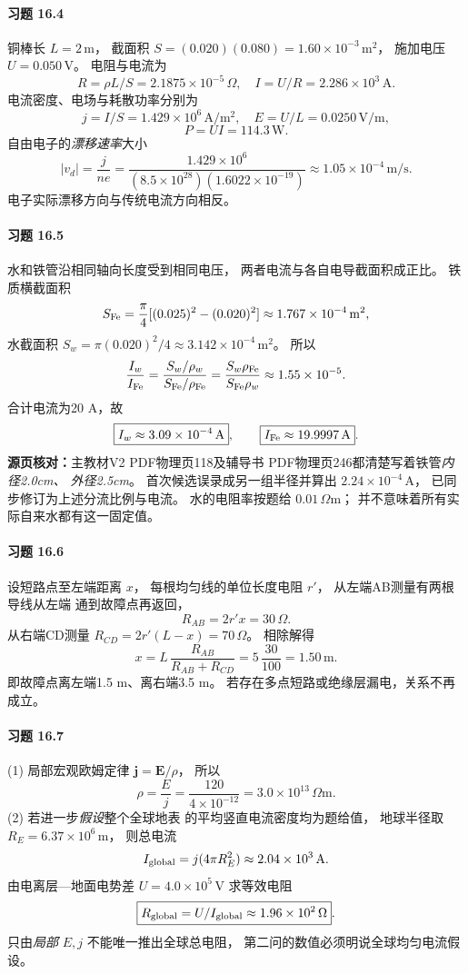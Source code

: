 \paragraph{习题 16.4}
铜棒长 \(L=2\,\mathrm m\)，
截面积
\(S=(0.020)(0.080)=1.60\times10^{-3}\,\mathrm{m^2}\)，
施加电压 \(U=0.050\,\mathrm V\)。
电阻与电流为
\[
 \boxed{R=\rho L/S=2.1875\times10^{-5}\,\Omega},
\quad
 \boxed{I=U/R=2.286\times10^3\,\mathrm A}.
\]
电流密度、电场与耗散功率分别为
\[
 \boxed{j=I/S=1.429\times10^6\,\mathrm{A/m^2}},
\quad
 \boxed{E=U/L=0.0250\,\mathrm{V/m}},
\]
\[
 \boxed{P=UI=114.3\,\mathrm W}.
\]
自由电子的\emph{漂移速率}大小
\[
 \boxed{|v_d|=\frac{j}{ne}
 =\frac{1.429\times10^6}
 {(8.5\times10^{28})(1.6022\times10^{-19})}
 \approx1.05\times10^{-4}\,\mathrm{m/s}}.
\]
电子实际漂移方向与传统电流方向相反。

\paragraph{习题 16.5}
水和铁管沿相同轴向长度受到相同电压，
两者电流与各自电导截面积成正比。
铁质横截面积
\[
 S_{\rm Fe}=\frac\pi4
 [(0.025)^2-(0.020)^2]
 \approx1.767\times10^{-4}\,\mathrm{m^2},
\]
水截面积
\(S_w=\pi(0.020)^2/4
 \approx3.142\times10^{-4}\,\mathrm{m^2}\)。
所以
\[
 \frac{I_w}{I_{\rm Fe}}=
 \frac{S_w/\rho_w}{S_{\rm Fe}/\rho_{\rm Fe}}
 =\frac{S_w\rho_{\rm Fe}}{S_{\rm Fe}\rho_w}
 \approx1.55\times10^{-5}.
\]
合计电流为20 A，故
\[
 \boxed{I_w\approx3.09\times10^{-4}\,\mathrm A},
\qquad
 \boxed{I_{\rm Fe}\approx19.9997\,\mathrm A}.
\]
\textbf{源页核对：}主教材V2 PDF物理页118及辅导书
PDF物理页246都清楚写着铁管\emph{内径2.0cm、
外径2.5cm}。
首次候选误录成另一组半径并算出
\(2.24\times10^{-4}\,\mathrm A\)，
已同步修订为上述分流比例与电流。
水的电阻率按题给 \(0.01\,\Omega\mathrm m\)；
并不意味着所有实际自来水都有这一固定值。

\paragraph{习题 16.6}
设短路点至左端距离 \(x\)，
每根均匀线的单位长度电阻 \(r'\)，
从左端AB测量有两根导线从左端
通到故障点再返回，
\[
 R_{AB}=2r'x=30\,\Omega.
\]
从右端CD测量
\(R_{CD}=2r'(L-x)=70\,\Omega\)。
相除解得
\[
 \boxed{x=L\,\frac{R_{AB}}{R_{AB}+R_{CD}}
 =5\,\frac{30}{100}=1.50\,\mathrm m}.
\]
即故障点离左端1.5 m、离右端3.5 m。
若存在多点短路或绝缘层漏电，关系不再成立。

\paragraph{习题 16.7}
(1) 局部宏观欧姆定律
\(\boldsymbol j=\boldsymbol E/\rho\)，
所以
\[
 \boxed{\rho=\frac Ej
 =\frac{120}{4\times10^{-12}}
 =3.0\times10^{13}\,\Omega\mathrm m}.
\]
(2) 若进一步\emph{假设}整个全球地表
的平均竖直电流密度均为题给值，
地球半径取 \(R_E=6.37\times10^6\,\mathrm m\)，
则总电流
\[
 I_{\rm global}=j(4\pi R_E^2)
 \approx2.04\times10^3\,\mathrm A.
\]
由电离层—地面电势差
\(U=4.0\times10^5\,\mathrm V\) 求等效电阻
\[
 \boxed{R_{\rm global}=U/I_{\rm global}
 \approx1.96\times10^2\,\Omega}.
\]
只由\emph{局部} \(E,j\)
不能唯一推出全球总电阻，
第二问的数值必须明说全球均匀电流假设。

